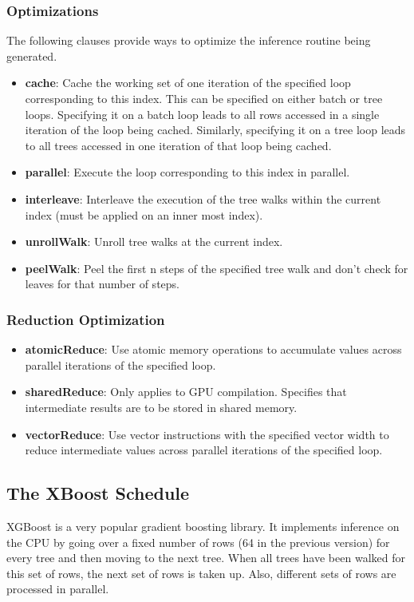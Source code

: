 \subsubsection{Optimizations}
The following clauses provide ways to optimize the inference routine being generated.
\begin{itemize}
  \item \textbf{cache}: Cache the working set of one iteration of the specified loop corresponding
  to this index. This can be specified on either batch or tree loops. Specifying it 
  on a batch loop leads to all rows accessed in a single iteration of the loop 
  being cached. Similarly, specifying it on a tree loop leads to all trees accessed in 
  one iteration of that loop being cached.
  \item \textbf{parallel}: Execute the loop corresponding to this index in parallel.
  \item \textbf{interleave}: Interleave the execution of the tree walks within the current index (must be applied on an inner most index).
  \item \textbf{unrollWalk}: Unroll tree walks at the current index. 
  \item \textbf{peelWalk}: Peel the first n steps of the specified tree walk and don't check for leaves for that number of steps.
\end{itemize}

\subsubsection{Reduction Optimization}
\begin{itemize}
  \item \textbf{atomicReduce}: Use atomic memory operations to accumulate values across 
  parallel iterations of the specified loop. 
  \item \textbf{sharedReduce}: Only applies to GPU compilation. Specifies that intermediate
  results are to be stored in shared memory.
  \item \textbf{vectorReduce}: Use vector instructions with the specified vector width 
  to reduce intermediate values across parallel iterations of the specified loop.
\end{itemize}


\subsection{The XBoost Schedule}
XGBoost\cite{XGBoost} is a very popular gradient boosting library. 
It implements inference on the CPU by going over a fixed number of rows (64 in the previous version)
for every tree and then moving to the next tree. When all trees have been walked for this 
set of rows, the next set of rows is taken up. Also, different sets of rows are 
processed in parallel.

